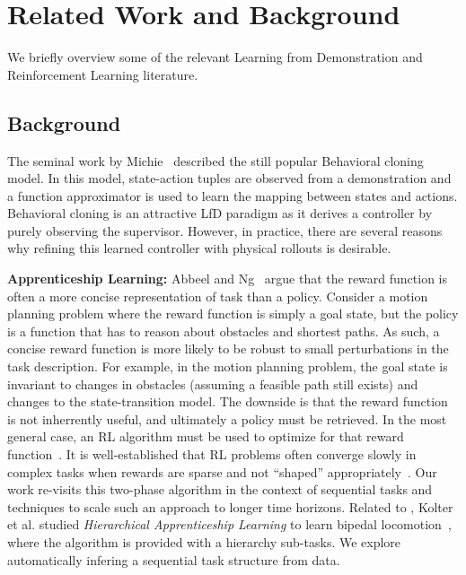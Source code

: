 %
\section{Related Work and Background}
We briefly overview some of the relevant Learning from Demonstration and Reinforcement Learning literature.

\subsection{Background}
The seminal work by Michie~\cite{michie1996behavioural} described the still popular Behavioral cloning model.
In this model, state-action tuples are observed from a demonstration and a function approximator is used to learn the mapping
between states and actions.
Behavioral cloning is an attractive LfD paradigm as it derives a controller by purely observing the supervisor.
However, in practice, there are several reasons why refining this learned controller with physical rollouts is desirable.

\vspace{0.5em}\noindent\textbf{Apprenticeship Learning: } Abbeel and Ng~\cite{ng2000algorithms, abbeel2004apprenticeship} argue that the reward function is often a more concise representation of task than a policy. Consider a motion planning problem where the reward function is simply a goal state, but the policy is a function that has to reason about obstacles and shortest paths. As such, a concise reward function is more likely to be robust to small perturbations in the task description. For example, in the motion planning problem, the goal state is invariant to changes in obstacles (assuming a feasible path still exists) and changes to the state-transition model. 
The downside is that the reward function is not inherrently useful, and ultimately a policy must be retrieved. In the most general case, an RL algorithm must be used to optimize for that reward function~\cite{abbeel2004apprenticeship}.
It is well-established that RL problems often converge slowly in complex tasks when rewards are sparse and not ``shaped'' appropriately~\cite{DBLP:conf/icml/NgHR99, DBLP:conf/aaai/JudahFTG14}.
Our work re-visits this two-phase algorithm in the context of sequential tasks and techniques to scale such an approach to longer time horizons.
Related to \hirl, Kolter et al. studied  \emph{Hierarchical Apprenticeship Learning} to learn bipedal locomotion~\cite{DBLP:conf/nips/KolterAN07}, where the algorithm is provided with a hierarchy sub-tasks.
We explore automatically infering a sequential task structure from data.

